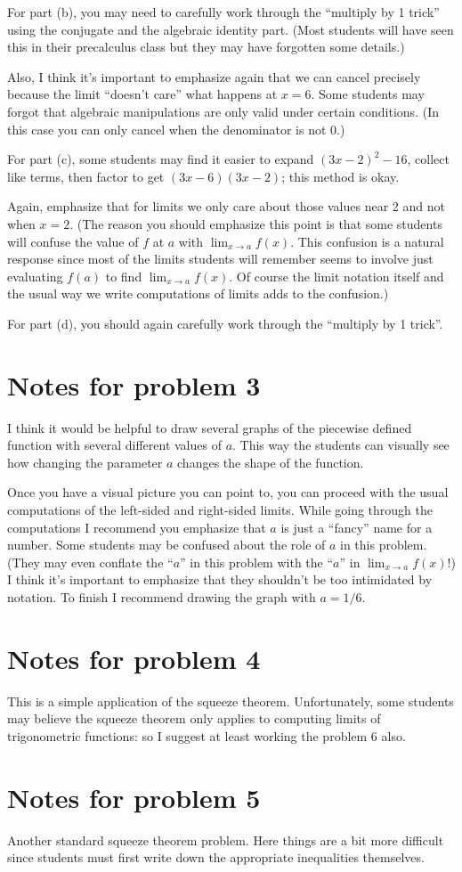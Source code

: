 \documentclass[nooutcomes]{ximera}
\begin{document}
For part (b), you may need to carefully work through the ``multiply by 1 trick'' using the conjugate and the algebraic identity part.
(Most students will have seen this in their precalculus class but they may have forgotten some details.)

Also, I think it's important to emphasize again that we can cancel precisely because the limit ``doesn't care'' what happens at $x = 6$.
Some students may forgot that algebraic manipulations are only valid under certain conditions.
(In this case you can only cancel when the denominator is not 0.)

For part (c), some students may find it easier to expand $(3x - 2)^2 - 16$, collect like terms, then factor to get $(3x-6)(3x-2)$; this method is okay.

Again, emphasize that for limits we only care about those values near 2 and not when $x = 2$.
(The reason you should emphasize this point is that some students will confuse the value of $f$ at $a$ with $\lim_{x \to a} f(x)$.
This confusion is a natural response since most of the limits students will remember seems to involve just evaluating $f(a)$ to find $\lim_{x \to a} f(x)$.
Of course the limit notation itself and the usual way we write computations of limits adds to the confusion.)

For part (d), you should again carefully work through the ``multiply by 1 trick''.

\section{Notes for problem 3}
I think it would be helpful to draw several graphs of the piecewise defined function with several different values of $a$.
This way the students can visually see how changing the parameter $a$ changes the shape of the function.

Once you have a visual picture you can point to, you can proceed with the usual computations of the left-sided and right-sided limits.
While going through the computations I recommend you emphasize that $a$ is just a ``fancy'' name for a number.
Some students may be confused about the role of $a$ in this problem.
(They may even conflate the ``$a$'' in this problem with the ``$a$'' in $\lim_{x \to a} f(x)$!)
I think it's important to emphasize that they shouldn't be too intimidated by notation.
To finish I recommend drawing the graph with $a = 1/6$.

\section{Notes for problem 4}
This is a simple application of the squeeze theorem.
Unfortunately, some students may believe the squeeze theorem only applies to computing limits of trigonometric functions: so I suggest at least working the problem 6 also.

\section{Notes for problem 5}
Another standard squeeze theorem problem.
Here things are a bit more difficult since students must first write down the appropriate inequalities themselves.
\end{document}
